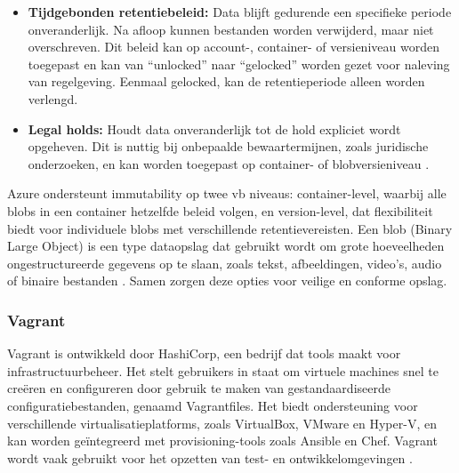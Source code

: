 \begin{itemize}[leftmargin=1cm]
    \item \textbf{Tijdgebonden retentiebeleid:} Data blijft gedurende een specifieke periode onveranderlijk. Na afloop kunnen bestanden worden verwijderd, maar niet overschreven. Dit beleid kan op account-, container- of versieniveau worden toegepast en kan van ``unlocked'' naar ``gelocked'' worden gezet voor naleving van regelgeving. Eenmaal gelocked, kan de retentieperiode alleen worden verlengd.
    \item \textbf{Legal holds:} Houdt data onveranderlijk tot de hold expliciet wordt opgeheven. Dit is nuttig bij onbepaalde bewaartermijnen, zoals juridische onderzoeken, en kan worden toegepast op container- of blobversieniveau \autocite{Estabrook2024`}.
\end{itemize}
Azure ondersteunt immutability op twee vb niveaus: container-level, waarbij alle blobs in een container hetzelfde beleid volgen, en version-level, dat flexibiliteit biedt voor individuele blobs met verschillende retentievereisten. Een blob (Binary Large Object) is een type dataopslag dat gebruikt wordt om grote hoeveelheden ongestructureerde gegevens op te slaan, zoals tekst, afbeeldingen, video's, audio of binaire bestanden \autocite{Kemp2007}. Samen zorgen deze opties voor veilige en conforme opslag.



\subsubsection{Vagrant}
Vagrant is ontwikkeld door HashiCorp, een bedrijf dat tools maakt voor infrastructuurbeheer. Het stelt gebruikers in staat om virtuele machines snel te creëren en configureren door gebruik te maken van gestandaardiseerde configuratiebestanden, genaamd Vagrantfiles. Het biedt ondersteuning voor verschillende virtualisatieplatforms, zoals VirtualBox, VMware en Hyper-V, en kan worden geïntegreerd met provisioning-tools zoals Ansible en Chef. Vagrant wordt vaak gebruikt voor het opzetten van test- en ontwikkelomgevingen \autocite{Hashicorp}.